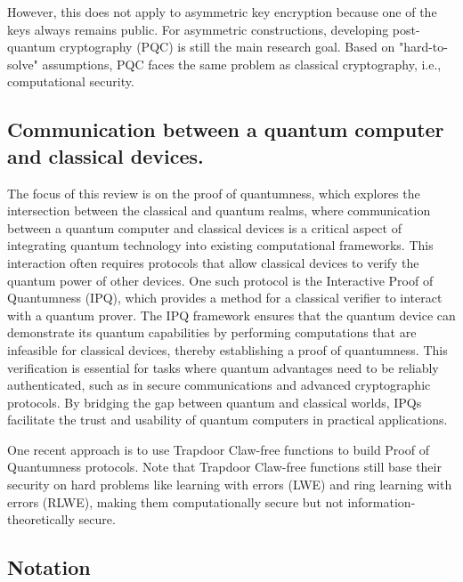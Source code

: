 \documentclass[cryptography,review,submit,pdftex,moreauthors,amsmath,amssymb,aps,strict]{Definitions/mdpi}
\begin{document}
However, this does not apply to asymmetric key encryption because one of the keys always remains public. For asymmetric constructions, developing post-quantum cryptography (PQC) is still the main research goal. Based on "hard-to-solve" assumptions, PQC faces the same problem as classical cryptography, i.e., computational security.

\subsection{Communication between a quantum computer and classical devices.}

The focus of this review is on the proof of quantumness, which explores the intersection between the classical and quantum realms, where communication between a quantum computer and classical devices is a critical aspect of integrating quantum technology into existing computational frameworks. This interaction often requires protocols that allow classical devices to verify the quantum power of other devices. One such protocol is the Interactive Proof of Quantumness (IPQ), which provides a method for a classical verifier to interact with a quantum prover. The IPQ framework ensures that the quantum device can demonstrate its quantum capabilities by performing computations that are infeasible for classical devices, thereby establishing a proof of quantumness. This verification is essential for tasks where quantum advantages need to be reliably authenticated, such as in secure communications and advanced cryptographic protocols. By bridging the gap between quantum and classical worlds, IPQs facilitate the trust and usability of quantum computers in practical applications.

One recent approach is to use Trapdoor Claw-free functions to build Proof of Quantumness protocols. Note that Trapdoor Claw-free functions still base their security on hard problems like learning with errors (LWE) and ring learning with errors (RLWE), making them computationally secure but not information-theoretically secure.

\subsection{Notation}
\end{document}
